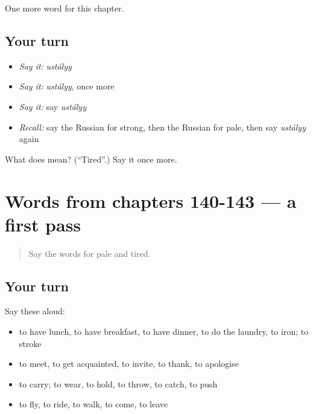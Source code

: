 \begin{grammarlens}[title={What you've built}]
One more word for this chapter.
\end{grammarlens}

\subsection*{Your turn}
\begin{itemize}
\raggedright
  \item \emph{Say it:} \emph{ustályy}
  \item \emph{Say it:} \emph{ustályy}, once more
  \item \emph{Say it:} say \emph{ustályy}
  \item \emph{Recall:} say the Russian for strong, then the Russian for pale, then say \emph{ustályy} again
\end{itemize}

\begin{tcolorbox}[breakable,colback=teal!4,colframe=teal!35!black,title={Before you move on}]
What does  mean? (\textquotedblleft{}Tired\textquotedblright{}.) Say it once more.
\end{tcolorbox}
\section[(dialogue)]{Words from chapters 140-143 — a first pass}

\label{lesson:RU-R148-first-pass-words-from-chapters-140-143}



\begin{quote}
Say the words for pale and tired.
\end{quote}

\subsection*{Your turn}
Say these aloud:

\begin{itemize}
\raggedright
  \item to have lunch, to have breakfast, to have dinner, to do the laundry, to iron; to stroke
  \item to meet, to get acquainted, to invite, to thank, to apologise
  \item to carry; to wear, to hold, to throw, to catch, to push
  \item to fly, to ride, to walk, to come, to leave
\end{itemize}

